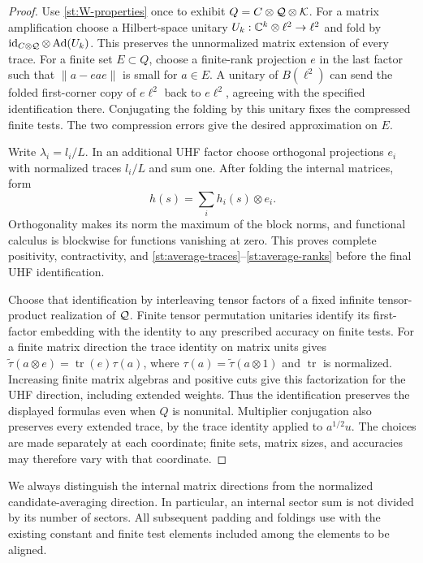 \begin{proof}
Use \eqref{st:W-properties} once to exhibit
\(Q=C\otimes\mathcal Q\otimes\mathcal K\). For a matrix amplification choose
a Hilbert-space unitary
\(U_k:\mathbb C^k\otimes\ell^2\to\ell^2\) and fold by
\(\operatorname{id}_{C\otimes\mathcal Q}\otimes\operatorname{Ad}(U_k)\).
This preserves the unnormalized matrix extension of every trace.
For a finite set \(E\subset Q\), choose a finite-rank projection
\(e\) in the last factor such that
\(\|a-eae\|\) is small for \(a\in E\).
A unitary of \(B(\ell^2)\) can send the folded first-corner copy
of \(e\ell^2\) back to \(e\ell^2\), agreeing with the specified
identification there. Conjugating the folding by this unitary fixes
the compressed finite tests. The two compression errors give the
desired approximation on \(E\).

Write \(\lambda_i=l_i/L\). In an additional UHF factor choose
orthogonal projections \(e_i\) with normalized traces
\(l_i/L\) and sum one. After folding the internal matrices, form
\[
 h(s)=\sum_i h_i(s)\otimes e_i.
\]
Orthogonality makes its norm the maximum of the block norms, and
functional calculus is blockwise for functions vanishing at zero.
This proves complete positivity, contractivity, and
\eqref{st:average-traces}--\eqref{st:average-ranks} before the final
UHF identification.

Choose that identification by interleaving tensor factors of a fixed
infinite tensor-product realization of \(\mathcal Q\). Finite tensor
permutation unitaries identify its first-factor embedding with the
identity to any prescribed accuracy on finite tests. For a finite
matrix direction the trace identity on matrix units gives
\(\widetilde\tau(a\otimes e)=\operatorname{tr}(e)\tau(a)\),
where \(\tau(a)=\widetilde\tau(a\otimes1)\) and
\(\operatorname{tr}\) is normalized. Increasing finite matrix
algebras and positive cuts give this factorization for the UHF
direction, including extended weights. Thus the identification
preserves the displayed formulas even when \(Q\) is nonunital.
Multiplier conjugation also preserves every extended trace, by the
trace identity applied to \(a^{1/2}u\).
The choices are made separately at each coordinate; finite sets,
matrix sizes, and accuracies may therefore vary with that coordinate.
\end{proof}

We always distinguish the internal matrix directions from the
normalized candidate-averaging direction. In particular, an internal
sector sum is not divided by its number of sectors. All subsequent
padding and foldings use  with the existing constant
and finite test elements included among the elements to be aligned.
